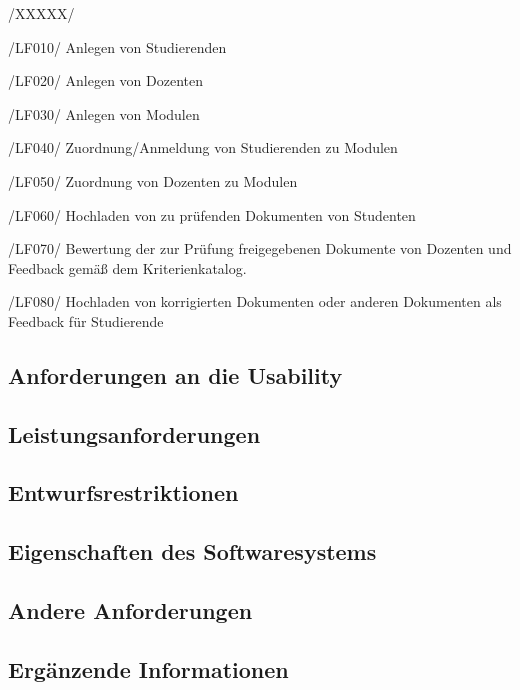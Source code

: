 \begin{center}
{
  \begin{minipage}{0.9\textwidth}
	\begin{labeling}{/XXXXX/}
	\item[/LF010/] Anlegen von Studierenden
	\item[/LF020/] Anlegen von Dozenten
	\item[/LF030/] Anlegen von Modulen
	\item[/LF040/] Zuordnung/Anmeldung von Studierenden zu Modulen
	\item[/LF050/] Zuordnung von Dozenten zu Modulen
	\item[/LF060/] Hochladen von zu prüfenden Dokumenten von Studenten 
	\item[/LF070/] Bewertung der zur Prüfung freigegebenen Dokumente von 
	               Dozenten und Feedback gemäß dem Kriterienkatalog.
	\item[/LF080/] Hochladen von korrigierten Dokumenten oder anderen Dokumenten 
	               als Feedback für Studierende
	\end{labeling}
  \end{minipage}
}
\end{center}

\subsection{Anforderungen an die Usability}

\subsection{Leistungsanforderungen}

\subsection{Entwurfsrestriktionen}

\subsection{Eigenschaften des Softwaresystems}

\subsection{Andere Anforderungen}

\subsection{Ergänzende Informationen}